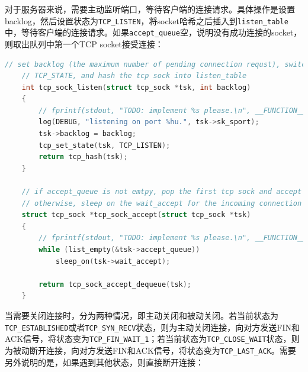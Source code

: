 \documentclass[UTF8]{report}
\begin{document}
对于服务器来说，需要主动监听端口，等待客户端的连接请求。具体操作是设置backlog，然后设置状态为\texttt{TCP_LISTEN}，将socket哈希之后插入到\texttt{listen_table}中，等待客户端的连接请求。如果\texttt{accept_queue}空，说明没有成功连接的socket，则取出队列中第一个TCP socket接受连接：

\begin{lstlisting}[language=C]
    // set backlog (the maximum number of pending connection requst), switch the
    // TCP_STATE, and hash the tcp sock into listen_table
    int tcp_sock_listen(struct tcp_sock *tsk, int backlog)
    {
        // fprintf(stdout, "TODO: implement %s please.\n", __FUNCTION__);
        log(DEBUG, "listening on port %hu.", tsk->sk_sport);
        tsk->backlog = backlog;
        tcp_set_state(tsk, TCP_LISTEN);
        return tcp_hash(tsk);
    }

    // if accept_queue is not emtpy, pop the first tcp sock and accept it,
    // otherwise, sleep on the wait_accept for the incoming connection requests
    struct tcp_sock *tcp_sock_accept(struct tcp_sock *tsk)
    {
        // fprintf(stdout, "TODO: implement %s please.\n", __FUNCTION__);
        while (list_empty(&tsk->accept_queue))
            sleep_on(tsk->wait_accept);
        
        return tcp_sock_accept_dequeue(tsk);
    }    
\end{lstlisting}

当需要关闭连接时，分为两种情况，即主动关闭和被动关闭。若当前状态为\texttt{TCP_ESTABLISHED}或者\texttt{TCP_SYN_RECV}状态，则为主动关闭连接，向对方发送FIN和ACK信号，将状态变为\texttt{TCP_FIN_WAIT_1}；若当前状态为\texttt{TCP_CLOSE_WAIT}状态，则为被动断开连接，向对方发送FIN和ACK信号，将状态变为\texttt{TCP_LAST_ACK}。需要另外说明的是，如果遇到其他状态，则直接断开连接：
\end{document}
